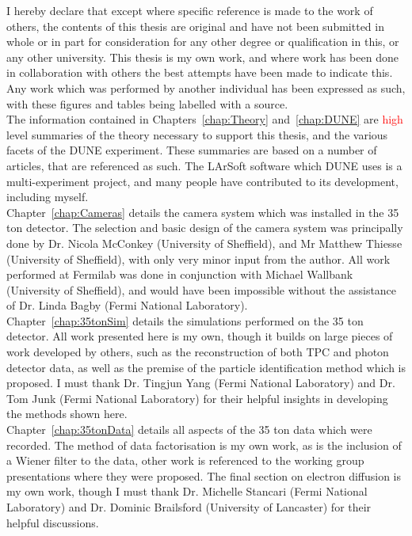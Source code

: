 
\begin{declaration}

  I hereby declare that except where specific reference is made to the work of others, the contents of this thesis are original and have not been submitted in whole or in part for consideration for any other degree or qualification in this, or any other university. This thesis is my own work, and where work has been done in collaboration with others the best attempts have been made to indicate this. Any work which was performed by another individual has been expressed as such, with these figures and tables being labelled with a source. \\

  The information contained in Chapters~\ref{chap:Theory} and~\ref{chap:DUNE} are \textcolor{red}{high} level summaries of the theory necessary to support this thesis, and the various facets of the DUNE experiment. These summaries are based on a number of articles, that are referenced as such. The LArSoft software which DUNE uses is a multi-experiment project, and many people have contributed to its development, including myself. \\

  Chapter~\ref{chap:Cameras} details the camera system which was installed in the 35 ton detector. The selection and basic design of the camera system was principally done by Dr. Nicola McConkey (University of Sheffield), and Mr Matthew Thiesse (University of Sheffield), with only very minor input from the author. All work performed at Fermilab was done in conjunction with Michael Wallbank (University of Sheffield), and would have been impossible without the assistance of Dr. Linda Bagby (Fermi National Laboratory). \\

  Chapter~\ref{chap:35tonSim} details the simulations performed on the 35 ton detector. All work presented here is my own, though it builds on large pieces of work developed by others, such as the reconstruction of both TPC and photon detector data, as well as the premise of the particle identification method which is proposed. I must thank Dr. Tingjun Yang (Fermi National Laboratory) and Dr. Tom Junk (Fermi National Laboratory) for their helpful insights in developing the methods shown here. \\

  Chapter~\ref{chap:35tonData} details all aspects of the 35 ton data which were recorded. The method of data factorisation is my own work, as is the inclusion of a Wiener filter to the data, other work is referenced to the working group presentations where they were proposed. The final section on electron diffusion is my own work, though I must thank Dr. Michelle Stancari (Fermi National Laboratory) and Dr. Dominic Brailsford (University of Lancaster) for their helpful discussions. \\


\end{declaration}
